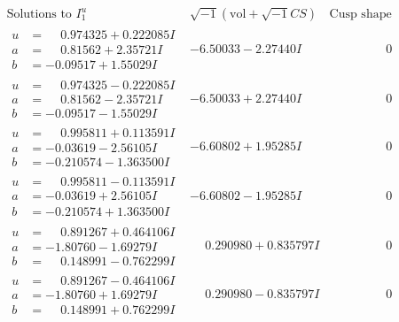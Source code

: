 \documentclass[1p]{elsarticle_modified}
\theoremstyle{definition}
\newcommand{\I}{\sqrt{-1}}
\begin{document}
$$\begin{array}{c|c|c}  
\text{Solutions to }I^u_{1}& \I (\text{vol} + \sqrt{-1}CS) & \text{Cusp shape}\\
 \hline 
\begin{aligned}
u &= \phantom{-}0.974325 + 0.222085 I \\
a &= \phantom{-}0.81562 + 2.35721 I \\
b &= -0.09517 + 1.55029 I\end{aligned}
 & -6.50033 - 2.27440 I & \phantom{-0.000000 } 0 \\ \hline\begin{aligned}
u &= \phantom{-}0.974325 - 0.222085 I \\
a &= \phantom{-}0.81562 - 2.35721 I \\
b &= -0.09517 - 1.55029 I\end{aligned}
 & -6.50033 + 2.27440 I & \phantom{-0.000000 } 0 \\ \hline\begin{aligned}
u &= \phantom{-}0.995811 + 0.113591 I \\
a &= -0.03619 - 2.56105 I \\
b &= -0.210574 - 1.363500 I\end{aligned}
 & -6.60802 + 1.95285 I & \phantom{-0.000000 } 0 \\ \hline\begin{aligned}
u &= \phantom{-}0.995811 - 0.113591 I \\
a &= -0.03619 + 2.56105 I \\
b &= -0.210574 + 1.363500 I\end{aligned}
 & -6.60802 - 1.95285 I & \phantom{-0.000000 } 0 \\ \hline\begin{aligned}
u &= \phantom{-}0.891267 + 0.464106 I \\
a &= -1.80760 - 1.69279 I \\
b &= \phantom{-}0.148991 - 0.762299 I\end{aligned}
 & \phantom{-}0.290980 + 0.835797 I & \phantom{-0.000000 } 0 \\ \hline\begin{aligned}
u &= \phantom{-}0.891267 - 0.464106 I \\
a &= -1.80760 + 1.69279 I \\
b &= \phantom{-}0.148991 + 0.762299 I\end{aligned}
 & \phantom{-}0.290980 - 0.835797 I & \phantom{-0.000000 } 0 \\ \hline\begin{aligned}

\end{aligned}
\end{array}$$
\end{document}
